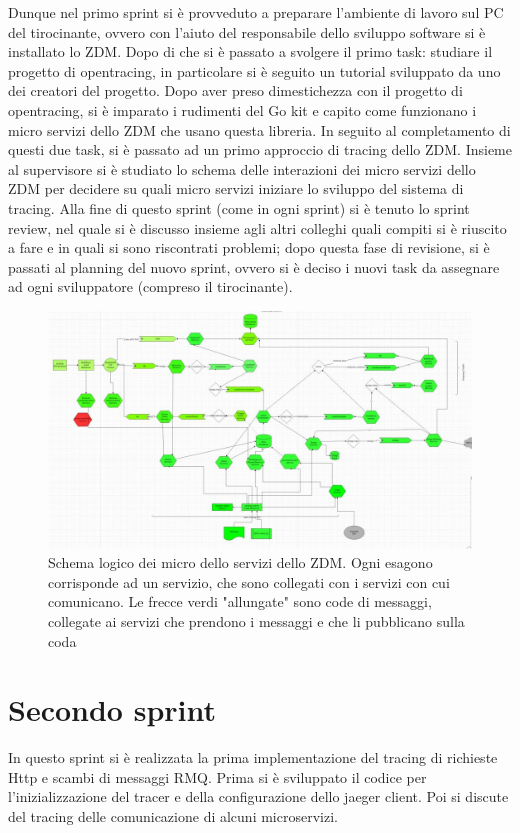 \documentclass[a4paper,12pt,titlepage,italian,openany]{report}
\begin{document}
Dunque nel primo sprint si è provveduto a preparare l'ambiente di lavoro sul PC del tirocinante, ovvero con l'aiuto del responsabile dello sviluppo software si è installato lo ZDM\cite{zdm:1}. Dopo di che si è passato a svolgere il primo task: studiare il progetto di opentracing, in particolare
si è seguito un tutorial sviluppato da uno dei creatori del progetto. Dopo aver preso dimestichezza con il progetto di opentracing, si è imparato i rudimenti del Go kit e capito come funzionano i micro servizi dello ZDM che usano questa libreria.
In seguito al completamento di questi due task, si è passato ad un primo approccio di tracing dello ZDM.
Insieme al supervisore si è studiato lo schema delle interazioni dei micro servizi dello ZDM\cite{zdm:1} per decidere su quali micro servizi iniziare lo sviluppo del sistema di tracing.
Alla fine di questo sprint (come in ogni sprint) si è tenuto lo sprint review, nel quale si è discusso insieme agli altri colleghi quali compiti si è  riuscito a fare e in quali si sono riscontrati problemi; dopo questa fase di revisione, si è passati al planning del nuovo sprint, ovvero si è deciso i nuovi task da assegnare ad ogni sviluppatore (compreso il tirocinante).
\begin{figure}[H]
    \includegraphics[scale=0.4]{41.jpg}
    \centering
    \caption{Schema logico dei micro dello servizi dello ZDM\cite{zdm:1}. Ogni esagono corrisponde ad un servizio, che sono collegati con i servizi con cui comunicano. Le frecce verdi "allungate" sono code di messaggi, collegate ai servizi che prendono i messaggi e che li pubblicano sulla coda }
\end{figure}  

\newpage
\section{Secondo sprint}
In questo sprint si è realizzata la prima implementazione del tracing di richieste Http e scambi di messaggi RMQ. Prima si 
è sviluppato il codice per l'inizializzazione del tracer e della configurazione dello jaeger client. Poi si discute del tracing delle comunicazione di alcuni microservizi.
\end{document}
